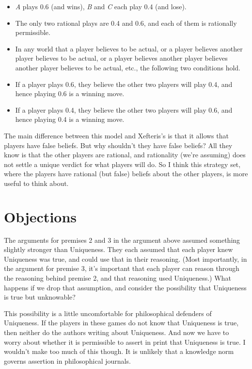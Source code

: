 \documentclass[
  12pt,
  letterpaper,
  DIV=11,
  numbers=noendperiod]{scrreprt}
\providecommand{\tightlist}{%
  \setlength{\itemsep}{0pt}\setlength{\parskip}{0pt}}\usepackage{longtable,booktabs,array}
\begin{document}
\begin{itemize}
\tightlist
\item
  \emph{A} plays 0.6 (and wins), \emph{B} and \emph{C} each play 0.4
  (and lose).
\item
  The only two rational plays are 0.4 and 0.6, and each of them is
  rationally permissible.
\item
  In any world that a player believes to be actual, or a player believes
  another player believes to be actual, or a player believes another
  player believes another player believes to be actual, etc., the
  following two conditions hold.
\item
  If a player plays 0.6, they believe the other two players will play
  0.4, and hence playing 0.6 is a winning move.
\item
  If a player plays 0.4, they believe the other two players will play
  0.6, and hence playing 0.4 is a winning move.
\end{itemize}

The main difference between this model and Xefteris's is that it allows
that players have false beliefs. But why shouldn't they have false
beliefs? All they know is that the other players are rational, and
rationality (we're assuming) does not settle a unique verdict for what
players will do. So I think this strategy set, where the players have
rational (but false) beliefs about the other players, is more useful to
think about.

\section{Objections}\label{objections}

The arguments for premises 2 and 3 in the argument above assumed
something slightly stronger than Uniqueness. They each assumed that each
player knew Uniqueness was true, and could use that in their reasoning.
(Most importantly, in the argument for premise 3, it's important that
each player can reason through the reasoning behind premise 2, and that
reasoning used Uniqueness.) What happens if we drop that assumption, and
consider the possibility that Uniqueness is true but unknowable?

This possibility is a little uncomfortable for philosophical defenders
of Uniqueness. If the players in these games do not know that Uniqueness
is true, then neither do the authors writing about Uniqueness. And now
we have to worry about whether it is permissible to assert in print that
Uniqueness is true. I wouldn't make too much of this though. It is
unlikely that a knowledge norm governs assertion in philosophical
journals.
\end{document}
